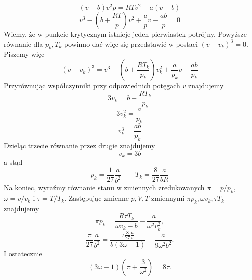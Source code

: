 \documentclass[11pt,a4paper]{article}
\newcounter{zadanie}\newcommand{\zadanie}[1][]{\addtocounter{zadanie}{1} ~\\  {\bf \emph{Zadanie \arabic{zadanie} #1 }} \\}
\begin{document}
\begin{equation*}
    (v-b)v^2p=RTv^2-a(v-b)
\end{equation*}
\begin{equation*}
    v^3-\left( b+\frac{RT}{p} \right)v^2+\frac{a}{p}v-\frac{ab}{p}=0
\end{equation*}
Wiemy, że w punkcie krytycznym istnieje jeden pierwiastek potrójny. Powyższe równanie dla $p_k, T_k$ powinno dać więc się przedstawić w postaci $(v-v_k)^3=0$. Piszemy więc
\begin{equation*}
    (v-v_k)^3=v^3-\left( b+\frac{RT_k}{p_k} \right)v_k^2+\frac{a}{p_k}v-\frac{ab}{p_k}
\end{equation*}
Przyrównując współczynniki przy odpowiednich potęgach $v$ znajdujemy
\begin{equation*}
    3v_k=b+\frac{RT_k}{p_k}
\end{equation*}
\begin{equation*}
    3v_k^2=\frac{a}{p_k}
\end{equation*}
\begin{equation*}
    v_k^3=\frac{ab}{p_k}
\end{equation*}
Dzieląc trzecie równanie przez drugie znajdujemy 
\begin{equation*}
    v_k=3b
\end{equation*}
a stąd
\begin{equation*}
    p_k=\frac{1}{27}\frac{a}{b^2} \qquad T_k=\frac{8}{27}\frac{a}{bR}
\end{equation*}
Na koniec, wyraźmy równanie stanu w zmiennych zredukowanych $\pi =p/p_k$, $\omega=v/v_k$ i $\tau=T/T_k$. Zastępując zmienne $p,V,T$ zmiennymi $\pi p_k, \omega v_k, \tau T_k$ znajdujemy
\begin{equation*}
    \pi p_k=\frac{R \tau T_k}{\omega v_k-b}-\frac{a}{\omega^2 v_k^2},
\end{equation*}
\begin{equation*}
    \frac{\pi}{27}\frac{a}{b^2}=\frac{\tau \frac{8}{27}\frac{a}{b}}{b(3\omega-1)}-\frac{a}{9\omega^2 b^2}.
\end{equation*}
I ostatecznie
\begin{equation*}
    (3 \omega-1) \left( \pi +\frac{3}{\omega^2} \right)=8 \tau.
\end{equation*}


\end{document}
